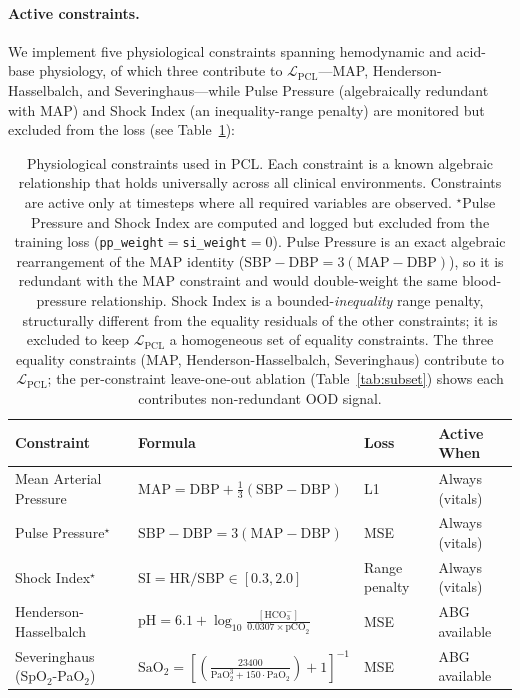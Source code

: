 \documentclass{article}
\begin{document}
\paragraph{Active constraints.}
We implement five physiological constraints spanning hemodynamic and acid-base physiology, of which three contribute to $\mathcal{L}_{\text{PCL}}$---MAP, Henderson-Hasselbalch, and Severinghaus---while Pulse Pressure (algebraically redundant with MAP) and Shock Index (an inequality-range penalty) are monitored but excluded from the loss (see Table~\ref{tab:constraints}):

\begin{table}[htbp]
\caption{Physiological constraints used in PCL. Each constraint is a known algebraic relationship that holds universally across all clinical environments. Constraints are active only at timesteps where all required variables are observed. $^\star$Pulse Pressure and Shock Index are computed and logged but excluded from the training loss (\texttt{pp\_weight}$=$\texttt{si\_weight}$=0$). Pulse Pressure is an exact algebraic rearrangement of the MAP identity ($\text{SBP}-\text{DBP}=3(\text{MAP}-\text{DBP})$), so it is redundant with the MAP constraint and would double-weight the same blood-pressure relationship. Shock Index is a bounded-\emph{inequality} range penalty, structurally different from the equality residuals of the other constraints; it is excluded to keep $\mathcal{L}_{\text{PCL}}$ a homogeneous set of equality constraints. The three equality constraints (MAP, Henderson-Hasselbalch, Severinghaus) contribute to $\mathcal{L}_{\text{PCL}}$; the per-constraint leave-one-out ablation (Table~\ref{tab:subset}) shows each contributes non-redundant OOD signal.}
\label{tab:constraints}
\centering
\small
\begin{tabular}{@{}llll@{}}
\toprule
Constraint & Formula & Loss & Active When \\
\midrule
Mean Arterial Pressure & $\text{MAP} = \text{DBP} + \frac{1}{3}(\text{SBP} - \text{DBP})$ & L1 & Always (vitals) \\
Pulse Pressure$^\star$ & $\text{SBP} - \text{DBP} = 3(\text{MAP} - \text{DBP})$ & MSE & Always (vitals) \\
Shock Index$^\star$ & $\text{SI} = \text{HR} / \text{SBP} \in [0.3, 2.0]$ & Range penalty & Always (vitals) \\
Henderson-Hasselbalch & $\text{pH} = 6.1 + \log_{10}\frac{[\text{HCO}_3^-]}{0.0307 \times \text{pCO}_2}$ & MSE & ABG available \\
Severinghaus (SpO$_2$-PaO$_2$) & $\text{SaO}_2 = \left[\left(\frac{23400}{\text{PaO}_2^3 + 150 \cdot \text{PaO}_2}\right) + 1\right]^{-1}$ & MSE & ABG available \\
\bottomrule
\end{tabular}
\end{table}
\end{document}
